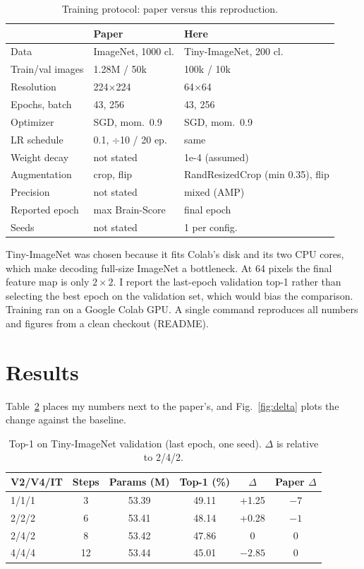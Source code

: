 \documentclass[conference]{IEEEtran}
\begin{document}
\begin{table}[t]
\caption{Training protocol: paper versus this reproduction.}
\label{tab:protocol}
\centering\small
\begin{tabular}{@{}lll@{}}
\toprule
 & Paper & Here \\
\midrule
Data & ImageNet, 1000 cl. & Tiny-ImageNet, 200 cl. \\
Train/val images & 1.28M / 50k & 100k / 10k \\
Resolution & 224$\times$224 & 64$\times$64 \\
Epochs, batch & 43, 256 & 43, 256 \\
Optimizer & SGD, mom.\ 0.9 & SGD, mom.\ 0.9 \\
LR schedule & 0.1, $\div$10 / 20 ep. & same \\
Weight decay & not stated & 1e-4 (assumed) \\
Augmentation & crop, flip & RandResizedCrop (min 0.35), flip \\
Precision & not stated & mixed (AMP) \\
Reported epoch & max Brain-Score & final epoch \\
Seeds & not stated & 1 per config. \\
\bottomrule
\end{tabular}
\end{table}

Tiny-ImageNet \cite{tinyimagenet} was chosen because it fits Colab's disk and its two CPU cores, which make decoding full-size ImageNet a bottleneck. At 64 pixels the final feature map is only $2\times2$. I report the last-epoch validation top-1 rather than selecting the best epoch on the validation set, which would bias the comparison. Training ran on a Google Colab GPU. A single command reproduces all numbers and figures from a clean checkout (README).

\section{Results}
Table~\ref{tab:results} places my numbers next to the paper's, and Fig.~\ref{fig:delta} plots the change against the baseline.

\begin{table}[t]
\caption{Top-1 on Tiny-ImageNet validation (last epoch, one seed). $\Delta$ is relative to 2/4/2.}
\label{tab:results}
\centering\small
\begin{tabular}{@{}lccccc@{}}
\toprule
V2/V4/IT & Steps & Params (M) & Top-1 (\%) & $\Delta$ & Paper $\Delta$ \\
\midrule
1/1/1 & 3 & 53.39 & 49.11 & +1.25 & $-7$ \\
2/2/2 & 6 & 53.41 & 48.14 & +0.28 & $-1$ \\
2/4/2 & 8 & 53.42 & 47.86 & 0 & 0 \\
4/4/4 & 12 & 53.44 & 45.01 & $-2.85$ & 0 \\
\bottomrule
\end{tabular}
\end{table}
\end{document}
